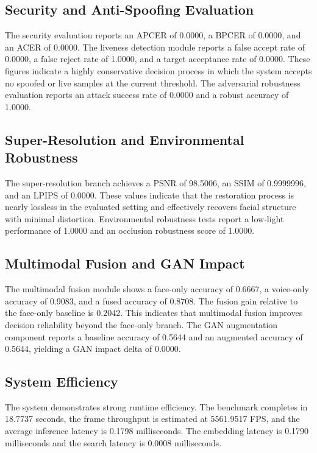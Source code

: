 \documentclass[conference]{IEEEtran}
\begin{document}
\subsection{Security and Anti-Spoofing Evaluation}
The security evaluation reports an APCER of 0.0000, a BPCER of 0.0000, and an ACER of 0.0000. The liveness detection module reports a false accept rate of 0.0000, a false reject rate of 1.0000, and a target acceptance rate of 0.0000. These figures indicate a highly conservative decision process in which the system accepts no spoofed or live samples at the current threshold. The adversarial robustness evaluation reports an attack success rate of 0.0000 and a robust accuracy of 1.0000.

\subsection{Super-Resolution and Environmental Robustness}
The super-resolution branch achieves a PSNR of 98.5006, an SSIM of 0.9999996, and an LPIPS of 0.0000. These values indicate that the restoration process is nearly lossless in the evaluated setting and effectively recovers facial structure with minimal distortion. Environmental robustness tests report a low-light performance of 1.0000 and an occlusion robustness score of 1.0000.

\subsection{Multimodal Fusion and GAN Impact}
The multimodal fusion module shows a face-only accuracy of 0.6667, a voice-only accuracy of 0.9083, and a fused accuracy of 0.8708. The fusion gain relative to the face-only baseline is 0.2042. This indicates that multimodal fusion improves decision reliability beyond the face-only branch. The GAN augmentation component reports a baseline accuracy of 0.5644 and an augmented accuracy of 0.5644, yielding a GAN impact delta of 0.0000.

\subsection{System Efficiency}
The system demonstrates strong runtime efficiency. The benchmark completes in 18.7737 seconds, the frame throughput is estimated at 5561.9517 FPS, and the average inference latency is 0.1798 milliseconds. The embedding latency is 0.1790 milliseconds and the search latency is 0.0008 milliseconds.
\end{document}
